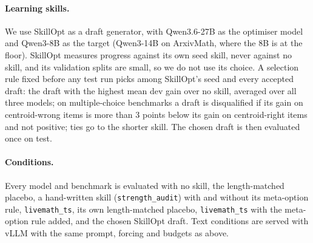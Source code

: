 \documentclass[11pt]{article}
\begin{document}
\begin{table}[t]
\centering\small
{}
\caption{The shortcut-free suite. Splits are a hash of the item id; ids are released, data is not.}
\label{tab:suite}
\end{table}

\paragraph{Learning skills.} We use SkillOpt \citep{yang2026skillopt} as a draft generator, with
Qwen3.6-27B as the optimiser model and Qwen3-8B as the target (Qwen3-14B on ArxivMath, where the 8B
is at the floor). SkillOpt measures progress against its own seed skill, never against no skill, and
its validation splits are small, so we do not use its choice. A selection rule fixed before any test
run picks among SkillOpt's seed and every accepted draft: the draft with the highest mean dev gain
over no skill, averaged over all three models; on multiple-choice benchmarks a draft is disqualified
if its gain on centroid-wrong items is more than 3 points below its gain on centroid-right items and
not positive; ties go to the shorter skill. The chosen draft is then evaluated once on test.

\paragraph{Conditions.} Every model and benchmark is evaluated with no skill, the length-matched
placebo, a hand-written skill (\texttt{strength\_audit}) with and without its meta-option rule,
\texttt{livemath\_ts}, its own length-matched placebo, \texttt{livemath\_ts} with the meta-option
rule added, and the chosen SkillOpt draft. Text conditions are served with vLLM \citep{kwon2023vllm}
with the same prompt, forcing and budgets as above.
\end{document}

